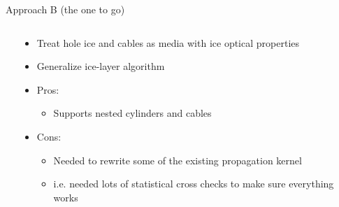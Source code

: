 \begin{frame}[fragile]{Approach B (the one to go)}

  \begin{columns}
    \begin{column}{0.5\textwidth}
    \end{column}
    \begin{column}{0.5\textwidth}
      \begin{itemize}
        \item Treat hole ice and cables as \alert{media with ice optical properties}
        \item Generalize ice-layer algorithm
        \item Pros:
        \begin{itemize}
          \item Supports \alert{nested cylinders} and \alert{cables}
        \end{itemize}
        \item Cons:
        \begin{itemize}
          \item Needed to \alert{rewrite} some of the existing propagation kernel
          \item i.e. needed lots of \alert{statistical cross checks} to make sure everything works
        \end{itemize}
      \end{itemize}
    \end{column}
  \end{columns}


\end{frame}

